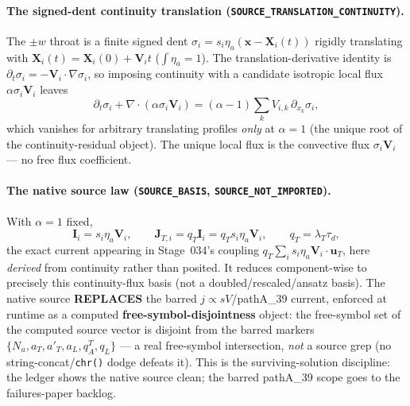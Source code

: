 \paragraph{The signed-dent continuity translation (\texttt{SOURCE\_TRANSLATION\_CONTINUITY}).}
The \(\pm w\) throat is a finite signed dent
\(\sigma_i=s_i\eta_a(\mathbf x-\mathbf X_i(t))\) rigidly translating with
\(\mathbf X_i(t)=\mathbf X_i(0)+\mathbf V_i t\) (\(\int\eta_a=1\)). The
translation-derivative identity is
\(\partial_t\sigma_i=-\mathbf V_i\!\cdot\!\nabla\sigma_i\), so imposing continuity
with a candidate isotropic local flux \(\alpha\sigma_i\mathbf V_i\) leaves
\[
  \partial_t\sigma_i+\nabla\!\cdot\!(\alpha\sigma_i\mathbf V_i)
  =(\alpha-1)\sum_k V_{i,k}\,\partial_{x_k}\sigma_i,
\]
which vanishes for arbitrary translating profiles \emph{only} at
\(\boxed{\alpha=1}\) (the unique root of the continuity-residual object). The
unique local flux is the convective flux \(\sigma_i\mathbf V_i\) --- no free flux
coefficient.

\paragraph{The native source law (\texttt{SOURCE\_BASIS}, \texttt{SOURCE\_NOT\_IMPORTED}).}
With \(\alpha=1\) fixed,
\[
  \mathbf I_i=s_i\eta_a\mathbf V_i,\qquad
  \mathbf J_{T,i}=q_T\mathbf I_i=q_T s_i\eta_a\mathbf V_i,\qquad
  q_T=\lambda_T\tau_d,
\]
the exact current appearing in Stage~034's coupling
\(q_T\sum_i s_i\eta_a\mathbf V_i\!\cdot\!\mathbf u_T\), here \emph{derived} from
continuity rather than posited. It reduces component-wise to precisely this
continuity-flux basis (not a doubled/rescaled/ansatz basis). The native source
\textbf{REPLACES} the barred \(j\propto sV\)/pathA\_39 current, enforced at runtime
as a computed \textbf{free-symbol-disjointness} object: the free-symbol set of the
computed source vector is disjoint from the barred markers
\(\{N_u,a_T,a'_T,a_L,q_A^T,q_L\}\) --- a real free-symbol intersection, \emph{not}
a source grep (no string-concat/\texttt{chr()} dodge defeats it). This is the
surviving-solution discipline: the ledger shows the native source clean; the
barred pathA\_39 scope goes to the failures-paper backlog.

